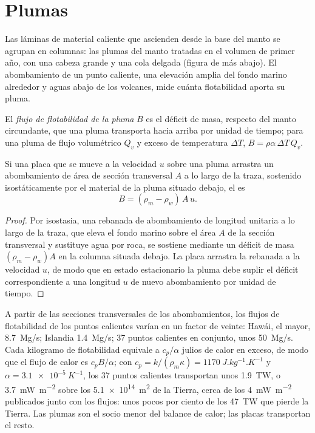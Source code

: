 \section{Plumas}

Las láminas de material caliente que ascienden desde la base del manto se agrupan en columnas: las plumas del manto
tratadas en el volumen de primer año, con una cabeza grande y una cola delgada (figura de más abajo).
El abombamiento de un punto caliente, una elevación amplia del fondo marino alrededor y aguas abajo de
los volcanes, mide cuánta flotabilidad aporta su pluma.

\begin{definition}\label{def:b3:mantle-convection:buoyancy-flux}
El \emph{flujo de flotabilidad de la pluma} $B$ es el déficit de masa,
respecto del manto circundante, que una pluma transporta hacia arriba por unidad de
tiempo; para una pluma de flujo volumétrico $Q_v$ y exceso de temperatura $\Delta T$,
$B = \rho\alpha\,\Delta T\,Q_v$.
\end{definition}

\begin{proposition}\label{prop:b3:mantle-convection:swell}
Si una placa que se mueve a la velocidad $u$ sobre una pluma arrastra un abombamiento de
área de sección transversal $A$ a lo largo de la traza, sostenido isostáticamente por el material de la pluma
situado debajo, el  es
\[
  B = (\rho_m - \rho_w)\,A\,u .
\]
\end{proposition}

\begin{proof}
Por isostasia, una rebanada de abombamiento de longitud unitaria a lo largo de la traza, que eleva
el fondo marino sobre el área $A$ de la sección transversal y sustituye agua por
roca, se sostiene mediante un déficit de masa $(\rho_m - \rho_w)A$ en la columna situada debajo.
La placa arrastra la rebanada a la velocidad $u$, de modo que en estado estacionario la
pluma debe suplir el déficit correspondiente a una longitud $u$ de nuevo abombamiento por unidad de tiempo.
\end{proof}

A partir de las secciones transversales de los abombamientos, los flujos de flotabilidad de los puntos calientes varían en
un factor de veinte: Hawái, el mayor, \qty{8.7}{Mg/s}; Islandia
\qty{1.4}{Mg/s}; 37 puntos calientes en conjunto, unos \qty{50}{Mg/s}. Cada kilogramo de
flotabilidad equivale a $c_p/\alpha$ julios de calor en exceso, de modo que el flujo de calor es $c_pB/\alpha$;
con $c_p = k/(\rho_m\kappa) = \qty{1170}{J.kg^{-1}.K^{-1}}$ y $\alpha =
\qty{3.1e-5}{K^{-1}}$, los 37 puntos calientes transportan unos \qty{1.9}{TW}, o
\qty{3.7}{mW.m^{-2}} sobre los \qty{5.1e14}{m^2} de la Tierra, cerca de los
\qty{4}{mW.m^{-2}} publicados junto con los flujos: unos pocos por ciento de los
\qty{47}{TW} que pierde la Tierra. Las plumas son el socio menor del
balance de calor; las placas transportan el resto.

